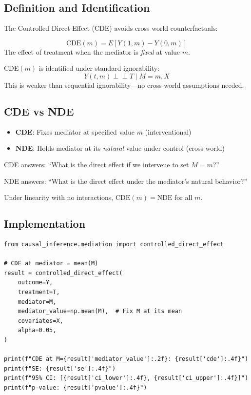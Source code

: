 \subsection{Definition and Identification}

The Controlled Direct Effect (CDE) avoids cross-world counterfactuals:

\begin{definition}
\begin{equation}
\text{CDE}(m) = E[Y(1, m) - Y(0, m)]
\end{equation}
The effect of treatment when the mediator is \textit{fixed} at value $m$.
\end{definition}

\begin{proposition}
CDE$(m)$ is identified under standard ignorability:
\begin{equation}
Y(t, m) \perp\!\!\!\perp T \mid M = m, X
\end{equation}
This is weaker than sequential ignorability---no cross-world assumptions needed.
\end{proposition}

\subsection{CDE vs NDE}

\begin{itemize}
\item \textbf{CDE}: Fixes mediator at specified value $m$ (interventional)
\item \textbf{NDE}: Holds mediator at its \textit{natural} value under control (cross-world)
\end{itemize}

CDE answers: ``What is the direct effect if we intervene to set $M = m$?''

NDE answers: ``What is the direct effect under the mediator's natural behavior?''

Under linearity with no interactions, $\text{CDE}(m) = \text{NDE}$ for all $m$.

\subsection{Implementation}

\begin{verbatim}
from causal_inference.mediation import controlled_direct_effect

# CDE at mediator = mean(M)
result = controlled_direct_effect(
    outcome=Y,
    treatment=T,
    mediator=M,
    mediator_value=np.mean(M),  # Fix M at its mean
    covariates=X,
    alpha=0.05,
)

print(f"CDE at M={result['mediator_value']:.2f}: {result['cde']:.4f}")
print(f"SE: {result['se']:.4f}")
print(f"95% CI: [{result['ci_lower']:.4f}, {result['ci_upper']:.4f}]")
print(f"p-value: {result['pvalue']:.4f}")
\end{verbatim}

